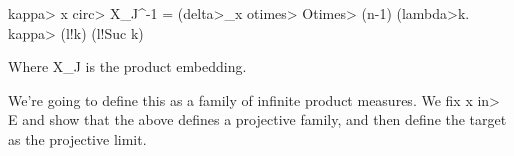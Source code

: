 \begin{isabellebody}
\begin{isamarkuptext}
  \<kappa> x \<circ> X_J^{-1} = (\<delta>_x \<otimes> \<Otimes> (n-1) (\<lambda>k. \<kappa> (l!k) (l!Suc k)

  Where X_J is the product embedding.

  We're going to define this as a family of infinite product measures. We fix x \<in> E and show that
  the above defines a projective family, and then define the target as the projective limit.%
\end{isamarkuptext}\isamarkuptrue%
\isamarkupfalse%
\isanewline
%
\isadelimtheory
\isanewline
%
\endisadelimtheory
%
\isatagtheory
{}\isamarkupfalse%
%
\endisatagtheory
{\isafoldtheory}%
%
\isadelimtheory
%
\endisadelimtheory
%
\end{isabellebody}%
\endinput
